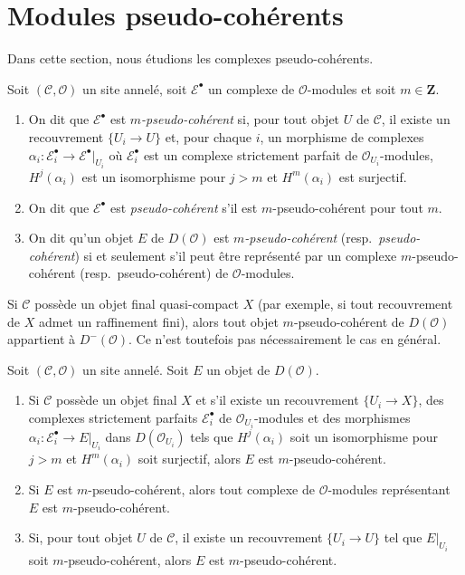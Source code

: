 \section{Modules pseudo-cohérents}
\label{section-pseudo-coherent}

\noindent
Dans cette section, nous étudions les complexes pseudo-cohérents.

\begin{definition}
\label{definition-pseudo-coherent}
Soit $(\mathcal{C}, \mathcal{O})$ un site annelé, soit
$\mathcal{E}^\bullet$ un complexe de $\mathcal{O}$-modules et soit
$m \in \mathbf{Z}$.
\begin{enumerate}
\item On dit que $\mathcal{E}^\bullet$ est {\it $m$-pseudo-cohérent} si, pour
tout objet $U$ de $\mathcal{C}$, il existe un recouvrement $\{U_i \to U\}$ et,
pour chaque $i$, un morphisme de complexes
$\alpha_i : \mathcal{E}_i^\bullet \to \mathcal{E}^\bullet|_{U_i}$
où $\mathcal{E}_i^\bullet$ est un complexe strictement parfait de
$\mathcal{O}_{U_i}$-modules, $H^j(\alpha_i)$ est un isomorphisme pour $j > m$ et
$H^m(\alpha_i)$ est surjectif.
\item On dit que $\mathcal{E}^\bullet$ est {\it pseudo-cohérent} s'il est
$m$-pseudo-cohérent pour tout $m$.
\item On dit qu'un objet $E$ de $D(\mathcal{O})$ est
{\it $m$-pseudo-cohérent} (resp.\ {\it pseudo-cohérent}) si et seulement s'il
peut être représenté par un complexe $m$-pseudo-cohérent
(resp.\ pseudo-cohérent) de $\mathcal{O}$-modules.
\end{enumerate}
\end{definition}

\noindent
Si $\mathcal{C}$ possède un objet final quasi-compact $X$ (par exemple, si
tout recouvrement de $X$ admet un raffinement fini), alors tout objet
$m$-pseudo-cohérent de $D(\mathcal{O})$ appartient à $D^-(\mathcal{O})$.
Ce n'est toutefois pas nécessairement le cas en général.

\begin{lemma}
\label{lemma-pseudo-coherent-independent-representative}
Soit $(\mathcal{C}, \mathcal{O})$ un site annelé.
Soit $E$ un objet de $D(\mathcal{O})$.
\begin{enumerate}
\item Si $\mathcal{C}$ possède un objet final $X$ et s'il existe un recouvrement
$\{U_i \to X\}$, des complexes strictement parfaits $\mathcal{E}_i^\bullet$
de $\mathcal{O}_{U_i}$-modules et des morphismes
$\alpha_i : \mathcal{E}_i^\bullet \to E|_{U_i}$ dans
$D(\mathcal{O}_{U_i})$ tels que $H^j(\alpha_i)$ soit un isomorphisme pour
$j > m$ et $H^m(\alpha_i)$ soit surjectif, alors $E$ est
$m$-pseudo-cohérent.
\item Si $E$ est $m$-pseudo-cohérent, alors tout complexe de
$\mathcal{O}$-modules représentant $E$ est $m$-pseudo-cohérent.
\item Si, pour tout objet $U$ de $\mathcal{C}$, il existe un recouvrement
$\{U_i \to U\}$ tel que $E|_{U_i}$ soit $m$-pseudo-cohérent, alors
$E$ est $m$-pseudo-cohérent.
\end{enumerate}
\end{lemma}

